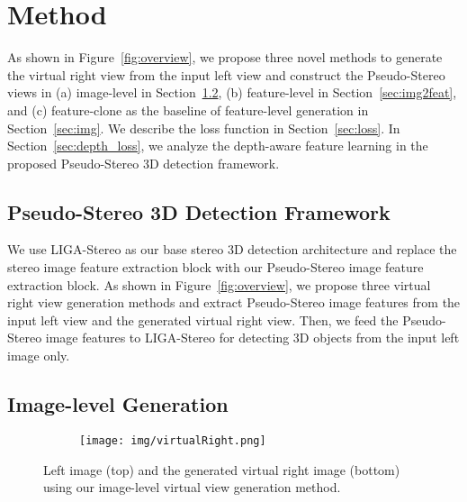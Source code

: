 \documentclass[10pt,twocolumn,letterpaper]{article}
\begin{document}
\section{Method}
As shown in Figure~\ref{fig:overview}, we propose three novel methods to generate the virtual right view from the input left view and construct the Pseudo-Stereo views in (a) image-level in Section~\ref{sec:img2img}, (b) feature-level in Section~\ref{sec:img2feat}, and (c) feature-clone as the baseline of feature-level generation in Section~\ref{sec:img}. We describe the loss function in Section~\ref{sec:loss}. In Section~\ref{sec:depth_loss}, we analyze the depth-aware feature learning in the proposed Pseudo-Stereo 3D detection framework.

\subsection{Pseudo-Stereo 3D Detection Framework}
We use LIGA-Stereo \cite{guo2021liga} as our base stereo 3D detection architecture and replace the stereo image feature extraction block with our Pseudo-Stereo image feature extraction block. As shown in Figure~\ref{fig:overview}, we propose three virtual right view generation methods and extract Pseudo-Stereo image features from the input left view and the generated virtual right view. Then, we feed the Pseudo-Stereo image features to LIGA-Stereo for detecting 3D objects from the input left image only. 


\subsection{Image-level Generation}\label{sec:img2img}
\begin{figure}[t!]
    \centering
    \begin{subfigure}{\columnwidth}
    \centering
        \texttt{[image: img/virtualRight.png]}
    \end{subfigure}
    \vspace{-3mm}
    \caption{\small Left image (top) and the generated virtual right image (bottom) using our image-level virtual view generation method.}
    \label{fig:left2right}
    \vspace{-4mm}
\end{figure}
\end{document}
